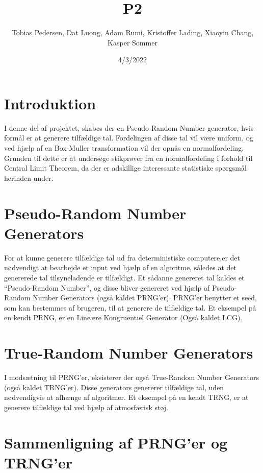 \documentclass[
]{article}
\title{P2}
\author{Tobias Pedersen, Dat Luong, Adam Rumi, Kristoffer Lading,
Xiaoyin Chang, Kasper Sommer}
\date{4/3/2022}
\begin{document}
\maketitle

\hypertarget{introduktion}{%
\section{Introduktion}\label{introduktion}}

I denne del af projektet, skabes der en Pseudo-Random Number generator,
hvis formål er at generere tilfældige tal. Fordelingen af disse tal vil
være uniform, og ved hjælp af en Box-Muller transformation vil der opnås
en normalfordeling. Grunden til dette er at undersøge stikprøver fra en
normalfordeling i forhold til Central Limit Theorem, da der er
adskillige interessante statistiske spørgsmål herinden under.

\hypertarget{pseudo-random-number-generators}{%
\section{Pseudo-Random Number
Generators}\label{pseudo-random-number-generators}}

For at kunne generere tilfældige tal ud fra deterministiske computere,er
det nødvendigt at bearbejde et input ved hjælp af en algoritme, således
at det genererede tal tilsyneladende er tilfældigt. Et sådanne genereret
tal kaldes et ``Pseudo-Random Number'', og disse bliver genereret ved
hjælp af Pseudo-Random Number Generators (også kaldet PRNG'er). PRNG'er
benytter et seed, som kan bestemmes af brugeren, til at generere de
tilfældige tal. Et eksempel på en kendt PRNG, er en Lineære Kongruentiel
Generator (Også kaldet LCG).

\hypertarget{true-random-number-generators}{%
\section{True-Random Number
Generators}\label{true-random-number-generators}}

I modsætning til PRNG'er, eksisterer der også True-Random Number
Generators (også kaldet TRNG'er). Disse generators genererer tilfældige
tal, uden nødvendigvis at afhænge af algoritmer. Et eksempel på en kendt
TRNG, er at generere tilfældige tal ved hjælp af atmosfærisk støj.

\hypertarget{sammenligning-af-prnger-og-trnger}{%
\section{Sammenligning af PRNG'er og
TRNG'er}\label{sammenligning-af-prnger-og-trnger}}
\end{document}

